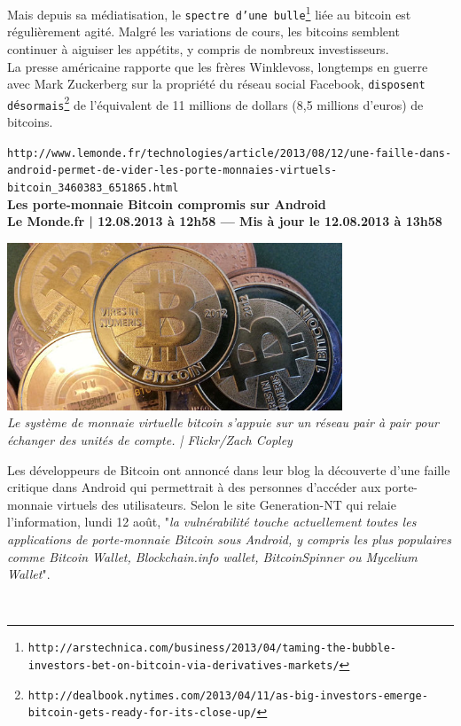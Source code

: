\documentclass[11pt,twoside,a4paper]{article}
\begin{document}
Mais depuis sa m{\'e}diatisation, le \texttt{spectre d'une bulle\footnote{\texttt{http://arstechnica.com/business/2013/04/taming-the-bubble-investors-bet-on-bitcoin-via-derivatives-markets/}}} li{\'e}e au bitcoin est r{\'e}guli{\`e}rement agit{\'e}. Malgr{\'e} les variations de cours, les bitcoins semblent continuer {\`a} aiguiser les app{\'e}tits, y compris de nombreux investisseurs. ~\\

La presse am{\'e}ricaine rapporte que les fr{\`e}res Winklevoss, longtemps en guerre avec Mark Zuckerberg sur la propri{\'e}t{\'e} du r{\'e}seau social Facebook, \texttt{disposent d{\'e}sormais\footnote{\texttt{http://dealbook.nytimes.com/2013/04/11/as-big-investors-emerge-bitcoin-gets-ready-for-its-close-up/}}} de l'{\'e}quivalent de 11 millions de dollars (8,5 millions d'euros) de bitcoins. ~\\

\clearpage

\texttt{http://www.lemonde.fr/technologies/article/2013/08/12/une-faille-dans-android-permet-de-vider-les-porte-monnaies-virtuels-bitcoin\_3460383\_651865.html}~\\

\textbf{Les porte-monnaie Bitcoin compromis sur Android}~\\

\textbf{\small Le Monde.fr | 12.08.2013 {\`a} 12h58 --- Mis {\`a} jour le 12.08.2013 {\`a} 13h58}~\\

\begin{minipage}[ht]{10.25cm}
	\includegraphics[width=10.00cm]{img/3156581_3_8f5d_le-systeme-de-monnaie-virtuelle-bitcoin_a85d434d2933b57b00d4d98f2c87cc10.jpg} ~\\
	\emph{ Le syst{\`e}me de monnaie virtuelle bitcoin s'appuie sur un r{\'e}seau pair {\`a} pair pour {\'e}changer des unit{\'e}s de compte. | Flickr/Zach Copley}~\\
\end{minipage} \hfill \begin{minipage}[ht]{9.00cm}
	Les d{\'e}veloppeurs de Bitcoin ont annonc{\'e} dans leur blog la d{\'e}couverte d'une faille critique dans Android qui permettrait {\`a} des personnes d'acc{\'e}der aux porte-monnaie virtuels des utilisateurs. Selon le site Generation-NT qui relaie l'information, lundi 12 ao{\^u}t, "\emph{la vuln{\'e}rabilit{\'e} touche actuellement toutes les applications de porte-monnaie Bitcoin sous Android, y compris les plus populaires comme Bitcoin Wallet, Blockchain.info wallet, BitcoinSpinner ou Mycelium Wallet}". ~\\	
\end{minipage}~\\
\end{document}
